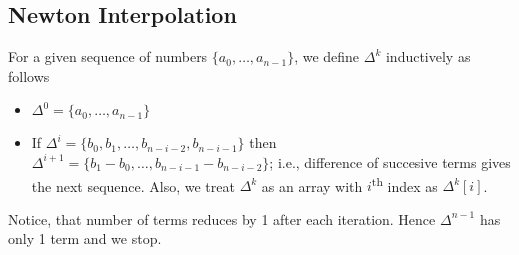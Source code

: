 \subsection{Newton Interpolation}{\label{pp:newtoninterpolation}}
For a given sequence of numbers $\{a_0,\ldots,a_{n-1}\}$, we define $\Delta ^{k}$ inductively as follows
\begin{itemize}
	\item $\Delta ^{0}=\{a_0,\ldots,a_{n-1}\}$
	\item If $\Delta ^{i}=\{b_0,b_1,\ldots,b_{n-i-2},b_{n-i-1}\}$ then $\Delta ^{i+1}=\{b_1-b_0,\ldots,b_{n-i-1}-b_{n-i-2}\}$; i.e., difference of succesive terms gives the next sequence. Also, we treat $\Delta ^{k}$ as an array with $i$\textsuperscript{th} index as $\Delta ^{k}[i]$.
\end{itemize}
Notice, that number of terms reduces by 1 after each iteration. Hence $\Delta ^{n-1}$ has only 1 term and we stop.

